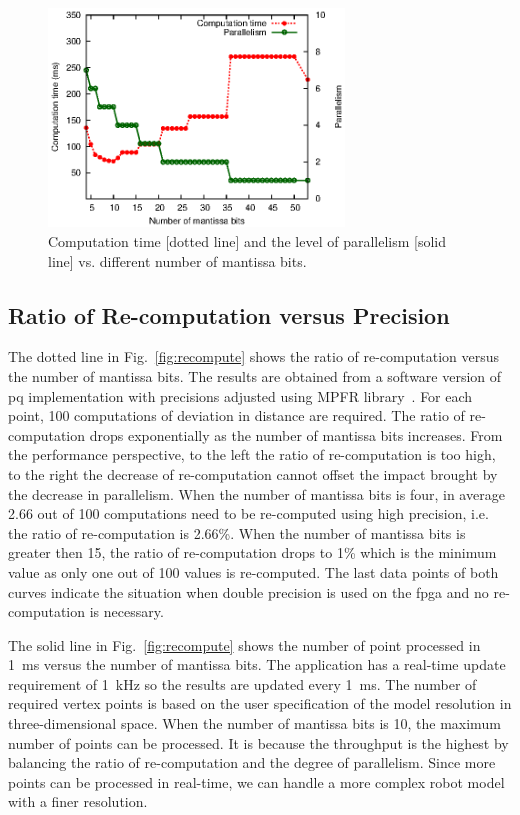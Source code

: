 \begin{figure}[ht]
\begin{center}
\includegraphics[width=0.7\textwidth]{mixed_precision/figures/fig_exectime}
\end{center}
\caption{Computation time [dotted line] and the level of parallelism [solid line] 
vs. different number of mantissa bits.}
\label{fig:exectime}
\end{figure}

\subsection{Ratio of Re-computation versus Precision}
\label{sec:recompute}
The dotted line in Fig.~\ref{fig:recompute} shows the ratio of re-computation versus the number of mantissa bits.
The results are obtained from a software version of \gls{pq} implementation with precisions adjusted using MPFR library~\cite{fousse07}.
For each point, 100 computations of deviation in distance are required.
The ratio of re-computation drops exponentially as the number of mantissa bits increases.
From the performance perspective, to the left the ratio of re-computation is too high, to the right the decrease of re-computation cannot offset the impact brought by the decrease in parallelism.
When the number of mantissa bits is four, in average 2.66 out of 100 computations need to be re-computed using high precision, i.e. the ratio of re-computation is 2.66\%.
When the number of mantissa bits is greater then 15, the ratio of re-computation drops to 1\% which is the minimum value as only one out of 100 values is re-computed.
The last data points of both curves indicate the situation when double precision is used on the \gls{fpga} and no re-computation is necessary.

The solid line in Fig.~\ref{fig:recompute} shows the number of point processed in 1~ms versus the number of mantissa bits.
The application has a real-time update requirement of 1~kHz so the results are updated every 1~ms.
The number of required vertex points is based on the user specification of the model resolution in three-dimensional space.
When the number of mantissa bits is 10, the maximum number of points can be processed.
It is because the throughput is the highest by balancing the ratio of re-computation and the degree of parallelism.
Since more points can be processed in real-time, we can handle a more complex robot model with a finer resolution.

